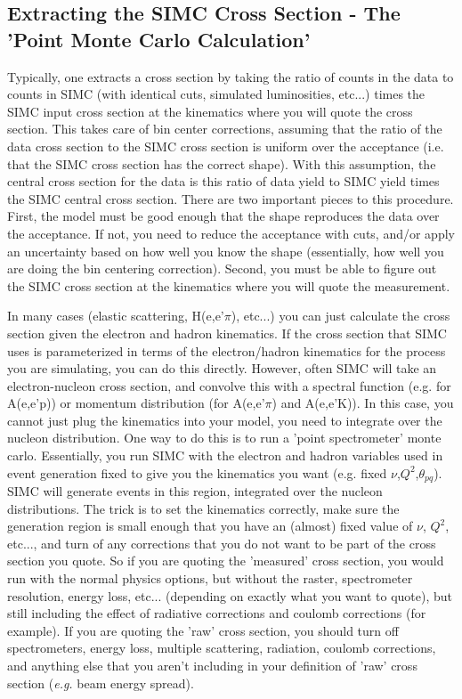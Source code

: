 \subsection{Extracting the SIMC Cross Section - The 'Point Monte Carlo Calculation'}

Typically, one extracts a cross section by taking the ratio of counts in the
data to counts in SIMC (with identical cuts, simulated luminosities, etc...)
times the SIMC input cross section at the kinematics where you will quote the
cross section.  This takes care of bin center corrections, assuming that the
ratio of the data cross section to the SIMC cross section is uniform over the
acceptance (i.e. that the SIMC cross section has the correct shape).  With
this assumption, the central cross section for the data is this ratio of 
data yield to SIMC yield times the SIMC central cross section.  There are two
important pieces to this procedure.  First, the model must be good enough that
the shape reproduces the data over the acceptance.  If not, you need to
reduce the acceptance with cuts, and/or apply an uncertainty based on how
well you know the shape (essentially, how well you are doing the bin centering
correction).  Second, you must be able to figure out the SIMC cross section at
the kinematics where you will quote the measurement.

In many cases (elastic scattering, H(e,e'$\pi$), etc...) you can just calculate
the cross section given the electron and hadron kinematics.  If the cross
section that SIMC uses is parameterized in terms of the electron/hadron
kinematics for the process you are simulating, you can do this directly.
However, often SIMC will take an electron-nucleon cross section, and convolve
this with a spectral function (e.g. for A(e,e'p)) or momentum distribution (for
A(e,e'$\pi$) and A(e,e'K)).  In this case, you cannot just plug the kinematics
into your model, you need to integrate over the nucleon distribution.  One way
to do this is to run a 'point spectrometer' monte carlo.  Essentially, you run
SIMC with the electron and hadron variables used in event generation fixed to
give you the kinematics you want (e.g. fixed $\nu$,$Q^2$,$\theta_{pq}$).  SIMC
will generate events in this region, integrated over the nucleon
distributions.  The trick is to set the kinematics correctly, make sure the
generation region is small enough that you have an (almost) fixed value of
$\nu$, $Q^2$, etc..., and turn of any corrections that you do not want to be
part of the cross section you quote. So if you are quoting the 'measured'
cross section, you would run with the normal physics options, but without the
raster, spectrometer resolution, energy loss, etc... (depending on exactly what
you want to quote), but still including the effect of radiative corrections
and coulomb corrections (for example). If you are quoting the 'raw' cross
section, you should turn off spectrometers, energy loss, multiple scattering,
radiation, coulomb corrections, and anything else that you aren't including in
your definition of 'raw' cross section ({\it e.g.} beam energy spread).

